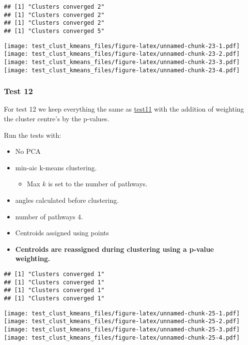 \documentclass[
]{article}
\providecommand{\tightlist}{%
  \setlength{\itemsep}{0pt}\setlength{\parskip}{0pt}}
\begin{document}
\begin{verbatim}
## [1] "Clusters converged 2"
## [1] "Clusters converged 2"
## [1] "Clusters converged 2"
## [1] "Clusters converged 5"
\end{verbatim}

\texttt{[image: test\_clust\_kmeans\_files/figure-latex/unnamed-chunk-23-1.pdf]}
\texttt{[image: test\_clust\_kmeans\_files/figure-latex/unnamed-chunk-23-2.pdf]}
\texttt{[image: test\_clust\_kmeans\_files/figure-latex/unnamed-chunk-23-3.pdf]}
\texttt{[image: test\_clust\_kmeans\_files/figure-latex/unnamed-chunk-23-4.pdf]}

\hypertarget{test12}{%
\subsubsection{Test 12}\label{test12}}

For test 12 we keep everything the same as
\protect\hyperlink{test11}{test11} with the addition of weighting the
cluster centre's by the p-values.

Run the tests with:

\begin{itemize}
\tightlist
\item
  No PCA
\item
  min-aic k-means clustering.

  \begin{itemize}
  \tightlist
  \item
    Max \(k\) is set to the number of pathways.
  \end{itemize}
\item
  angles calculated before clustering.
\item
  number of pathways 4.
\item
  Centroids assigned using points
\item
  \textbf{Centroids are reassigned during clustering using a p-value
  weighting.}
\end{itemize}

\begin{verbatim}
## [1] "Clusters converged 1"
## [1] "Clusters converged 1"
## [1] "Clusters converged 1"
## [1] "Clusters converged 1"
\end{verbatim}

\texttt{[image: test\_clust\_kmeans\_files/figure-latex/unnamed-chunk-25-1.pdf]}
\texttt{[image: test\_clust\_kmeans\_files/figure-latex/unnamed-chunk-25-2.pdf]}
\texttt{[image: test\_clust\_kmeans\_files/figure-latex/unnamed-chunk-25-3.pdf]}
\texttt{[image: test\_clust\_kmeans\_files/figure-latex/unnamed-chunk-25-4.pdf]}
\end{document}
